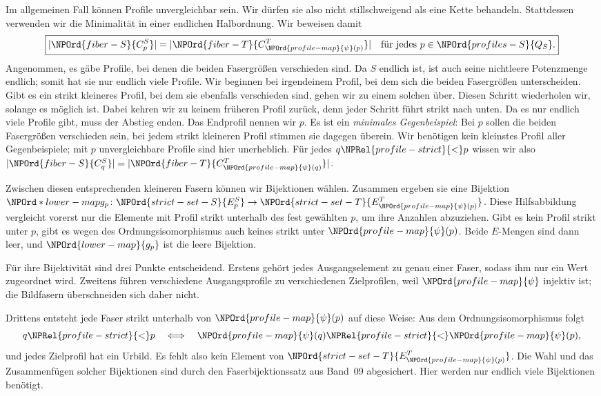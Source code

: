 \par{}
Im allgemeinen Fall können Profile unvergleichbar sein. Wir dürfen
sie also nicht stillschweigend als eine Kette behandeln. Stattdessen
verwenden wir die Minimalität in einer endlichen Halbordnung.
Wir beweisen damit
\[
 \boxed{|\NPOrd{fiber-S}{C_p^S}|=|\NPOrd{fiber-T}{C_{\NPOrd{profile-map}{\psi}(p)}^T}|\quad\text{für jedes }p\in \NPOrd{profiles-S}{Q_S}.}
\]
Angenommen, es gäbe Profile, bei denen die beiden Fasergrößen
verschieden sind. Da \(S\) endlich ist, ist auch seine nichtleere
Potenzmenge endlich; somit hat sie nur endlich viele Profile.
Wir beginnen bei irgendeinem Profil, bei dem sich die beiden
Fasergrößen unterscheiden. Gibt es ein strikt kleineres Profil,
bei dem sie ebenfalls verschieden sind, gehen wir zu einem solchen über. Diesen Schritt
wiederholen wir, solange es möglich ist. Dabei kehren wir zu keinem
früheren Profil zurück, denn jeder Schritt führt strikt nach unten.
Da es nur endlich viele Profile gibt, muss der Abstieg enden.
Das Endprofil nennen wir \(p\). Es ist ein \emph{minimales Gegenbeispiel}:
Bei \(p\) sollen die beiden Fasergrößen verschieden sein, bei jedem
strikt kleineren Profil stimmen sie dagegen überein.
Wir benötigen kein kleinstes Profil aller
Gegenbeispiele; mit \(p\) unvergleichbare Profile sind hier unerheblich.
Für jedes \(q\NPRel{profile-strict}{<}p\) wissen wir also
\(\lvert \NPOrd{fiber-S}{C_q^S}\rvert=\lvert \NPOrd{fiber-T}{C_{\NPOrd{profile-map}{\psi}(q)}^T}\rvert\).

Zwischen diesen entsprechenden kleineren Fasern können wir Bijektionen
wählen. Zusammen ergeben sie eine Bijektion
\(\NPOrd*{lower-map}{g_p}\colon \NPOrd{strict-set-S}{E_p^S}\to \NPOrd{strict-set-T}{E_{\NPOrd{profile-map}{\psi}(p)}^T}\).
Diese Hilfsabbildung vergleicht vorerst nur die Elemente mit Profil
strikt unterhalb des fest gewählten \(p\), um ihre Anzahlen abzuziehen.
Gibt es kein Profil strikt unter \(p\), gibt es wegen des
Ordnungsisomorphismus auch keines strikt unter \(\NPOrd{profile-map}{\psi}(p)\).
Beide \(E\)-Mengen sind dann leer, und \(\NPOrd{lower-map}{g_p}\) ist die leere Bijektion.
\par{}
Für ihre Bijektivität sind drei Punkte entscheidend.
Erstens gehört jedes Ausgangselement zu genau einer Faser, sodass ihm
nur ein Wert zugeordnet wird. Zweitens führen verschiedene Ausgangsprofile
zu verschiedenen Zielprofilen, weil \(\NPOrd{profile-map}{\psi}\) injektiv ist; die Bildfasern
überschneiden sich daher nicht.

\par{}
Drittens entsteht jede Faser
strikt unterhalb von \(\NPOrd{profile-map}{\psi}(p)\) auf diese Weise: Aus dem Ordnungsisomorphismus
folgt
\[
 q\NPRel{profile-strict}{<}p\quad\Longleftrightarrow\quad\NPOrd{profile-map}{\psi}(q)\NPRel{profile-strict}{<}\NPOrd{profile-map}{\psi}(p),
\]
und jedes Zielprofil hat ein Urbild. Es fehlt also kein Element
von \(\NPOrd{strict-set-T}{E_{\NPOrd{profile-map}{\psi}(p)}^T}\). Die Wahl und das Zusammenfügen solcher
Bijektionen sind durch den Faserbijektionssatz aus Band~09 abgesichert.
Hier werden nur endlich viele Bijektionen benötigt.

